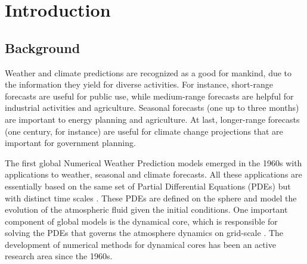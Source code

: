 

\chapter{Introduction}
\label{cap:introduction}

\enlargethispage{.5\baselineskip}

\section{Background}
Weather and climate predictions are recognized as a good for mankind,
due to the information they yield for diverse activities. 
For instance, short-range forecasts are useful for public use, while
medium-range forecasts are helpful for industrial activities and agriculture. 
Seasonal forecasts (one up to three months) are important to energy planning and agriculture.
At last, longer-range forecasts (one century, for instance) are useful for climate change 
projections that are important for government planning.

The first global Numerical Weather Prediction models emerged in the 1960s
with applications to weather, seasonal and climate forecasts. 
All these applications are essentially based on the same set of Partial Differential Equations
(PDEs) but with distinct time scales \citep{stan:2008}. These PDEs are defined on the sphere
and model the evolution of the atmospheric fluid given the initial conditions.
One important component of global models is the dynamical core, which is responsible
for solving the PDEs that governs the atmosphere dynamics on grid-scale \citep{will:2007}. 
The development of numerical methods for dynamical cores has been an active research area since the 1960s.

